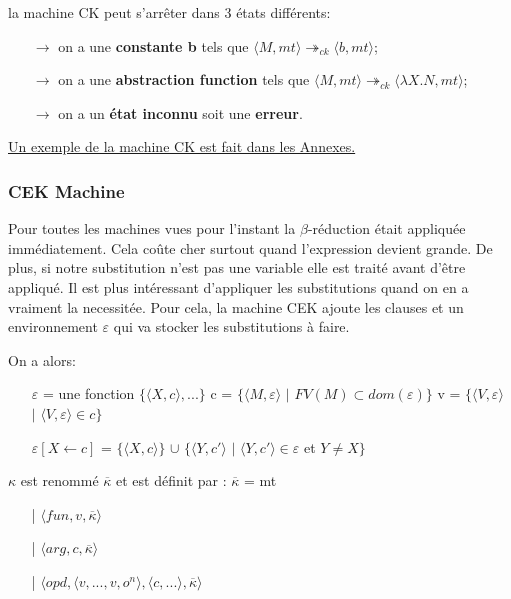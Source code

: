 \documentclass[10pt,a4paper]{article}
\begin{document}
			la machine CK peut s'arrêter dans 3 états différents:
			\begin{itemize}
				\item[]$\longrightarrow$ on a une \textbf{constante b} tels que $\langle M,mt\rangle \twoheadrightarrow_{ck} \langle b,mt\rangle$;
				\item[]$\longrightarrow$ on a une \textbf{abstraction function} tels que $\langle M,mt\rangle \twoheadrightarrow_{ck} \langle\lambda X.N,mt\rangle$;
				\item[]$\longrightarrow$ on a un \textbf{état inconnu} soit une \textbf{erreur}.
			\end{itemize}
			
			\hyperref[CK]{Un exemple de la machine CK est fait dans les Annexes.}
			\bigbreak
			
			\subsubsection{CEK Machine}
			Pour toutes les machines vues pour l'instant la $\beta$-réduction était appliquée immédiatement. Cela coûte cher surtout quand l'expression devient grande. De plus, si notre substitution n'est pas une variable elle est traité avant d'être appliqué.
			\smallbreak
			Il est plus intéressant d'appliquer les substitutions quand on en a vraiment la necessitée. Pour cela, la machine CEK ajoute les clauses et un environnement $\varepsilon$ qui va stocker les substitutions à faire.
			\medbreak
			
			On a alors:
			\begin{itemize}
				\item[] $\varepsilon$ = une fonction $\{\langle X,c\rangle,...\}$    c = $\{\langle M,\varepsilon\rangle$ $|$ $FV(M)\subset dom(\varepsilon)\}$    v = $\{\langle V,\varepsilon\rangle$ $|$ $\langle V,\varepsilon\rangle \in c\}$
				\item[] $\varepsilon[X \leftarrow c]$ = $\{\langle X,c\rangle\}$ $\cup$ $\{\langle Y,c'\rangle$ $|$ $\langle Y,c'\rangle \in \varepsilon$ et $ Y \neq X\}$
			\end{itemize}
			\medbreak
			
			$\kappa$ est renommé $\overline{\kappa}$ et est définit par :
			\smallbreak
			$\overline{\kappa}$ = mt
			\begin{itemize}
				\item[|] $\langle fun,v,\overline{\kappa} \rangle$
				\item[|] $\langle arg,c,\overline{\kappa} \rangle$
				\item[|] $\langle opd,\langle v,...,v,o^{n}\rangle,\langle c,... \rangle,\overline{\kappa} \rangle$
			\end{itemize}
			\bigbreak
			
\end{document}
